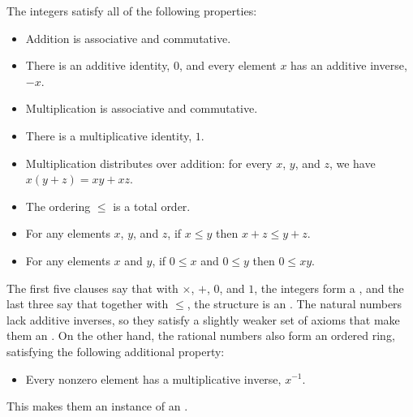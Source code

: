 \documentclass[letterpaper,10pt,english]{sphinxmanual}
\begin{document}
\sphinxAtStartPar
The integers satisfy all of the following properties:
\begin{itemize}
\item {} 
\sphinxAtStartPar
Addition is associative and commutative.

\item {} 
\sphinxAtStartPar
There is an additive identity, \(0\), and every element \(x\) has an additive inverse, \(-x\).

\item {} 
\sphinxAtStartPar
Multiplication is associative and commutative.

\item {} 
\sphinxAtStartPar
There is a multiplicative identity, \(1\).

\item {} 
\sphinxAtStartPar
Multiplication distributes over addition: for every \(x\), \(y\), and \(z\), we have \(x (y + z) = x y + x z\).

\item {} 
\sphinxAtStartPar
The ordering \(\leq\) is a total order.

\item {} 
\sphinxAtStartPar
For any elements \(x\), \(y\), and \(z\), if \(x \leq y\) then \(x + z \leq y + z\).

\item {} 
\sphinxAtStartPar
For any elements \(x\) and \(y\), if \(0 \leq x\) and \(0 \leq y\) then \(0 \leq x y\).

\end{itemize}

\sphinxAtStartPar
The first five clauses say that with \(\times\), \(+\), \(0\), and \(1\), the integers form a , and the last three say that together with \(\leq\), the structure is an . The natural numbers lack additive inverses, so they satisfy a slightly weaker set of axioms that make them an . On the other hand, the rational numbers also form an ordered ring, satisfying the following additional property:
\begin{itemize}
\item {} 
\sphinxAtStartPar
Every nonzero element has a multiplicative inverse, \(x^{-1}\).

\end{itemize}

\sphinxAtStartPar
This makes them an instance of an .
\end{document}
